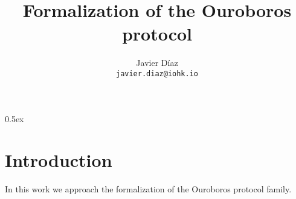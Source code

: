 \documentclass[a4paper,11pt]{article}
\begin{document}
\title{Formalization of the Ouroboros protocol}
\author{Javier D\'iaz\\\small\texttt{javier.diaz@iohk.io}}

\maketitle

\tableofcontents

\parindent 0pt\parskip 0.5ex

\section{Introduction}

In this work we approach the formalization of the Ouroboros protocol family.





\end{document}
